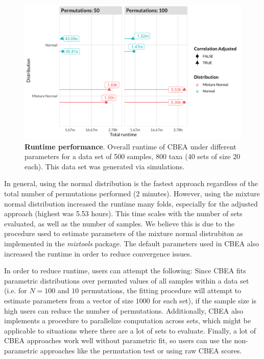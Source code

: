 \documentclass{article}
\begin{document}
\begin{figure}[!h]
    \centering
    \includegraphics[width=\textwidth]{figures/performance.png}
    \caption{\textbf{Runtime performance}. Overall runtime of CBEA under different parameters for a data set of 500 samples, 800 taxa (40 sets of size 20 each). This data set was generated via simulations.} 
    \label{fig:s6}
\end{figure}

In general, using the normal distribution is the fastest approach regardless of the total number of permutations performed (2 minutes). However, using the mixture normal distribution increased the runtime many folds, especially for the adjusted approach (highest was 5.53 hours). This time scales with the number of sets evaluated, as well as the number of samples. We believe this is due to the procedure used to estimate parameters of the mixture normal distrubiton as implemented in the \emph{mixtools} package. The default parameters used in CBEA also increased the runtime in order to reduce convergence issues.  

In order to reduce runtime, users can attempt the following: Since CBEA fits parametric distributions over permuted values of all samples within a data set (i.e. for $N = 100$ and $10$ permutations, the fitting procedure will attempt to estimate parameters from a vector of size $1000$ for each set), if the sample size is high users can reduce the number of permutations. Additionally, CBEA also implements a procedure to parallelize computation across sets, which might be applicable to situations where there are a lot of sets to evaluate. Finally, a lot of CBEA approaches work well without parametric fit, so users can use the non-parametric approaches like the permutation test or using raw CBEA scores. 
\end{document}
